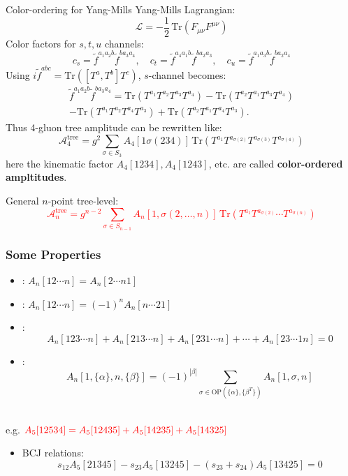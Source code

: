 \documentclass{beamer}
\begin{document}
\begin{frame}{Color-ordering for Yang-Mills}
\small
Yang-Mills Lagrangian:
\[
\mathcal{L}=-\frac12\,\mathrm{Tr}(F_{\mu\nu}F^{\mu\nu})
\]
Color factors for $s,t,u$ channels:
\[
c_s=\tilde{f}^{a_1a_2b}\tilde{f}^{ba_3a_4},\quad 
c_t=\tilde{f}^{a_4a_1b}\tilde{f}^{ba_2a_3},\quad 
c_u=\tilde{f}^{a_1a_3b}\tilde{f}^{ba_2a_4}
\]
Using $i\tilde{f}^{abc}=\mathrm{Tr}([T^a,T^b]T^c)$, $s$-channel becomes:
\begin{align*}
        \tilde{f}^{a_1a_2b}\tilde{f}^{ba_3a_4}=\mathrm{Tr}(T^{a_1}T^{a_2}T^{a_3}T^{a_4})-\mathrm{Tr}(T^{a_2}T^{a_1}T^{a_3}T^{a_4})\\
        -\mathrm{Tr}(T^{a_1}T^{a_2}T^{a_4}T^{a_3})+\mathrm{Tr}(T^{a_2}T^{a_1}T^{a_4}T^{a_3}).
    \end{align*}
Thus 4-gluon tree amplitude can be rewritten like:
\[
\mathcal{A}_4^{\text{tree}}
=g^2\!\!\sum_{\sigma\in S_3}
A_4[1\sigma(234)]\,\mathrm{Tr}(T^{a_1}T^{a_{\sigma(2)}}T^{a_{\sigma(3)}}T^{a_{\sigma(4)}})
\]
here the kinematic factor $A_4[1234],A_4[1243]$, etc. are called \textbf{color-ordered ampltitudes}.

General $n$-point tree-level:
\textcolor{red}{\[
\mathcal{A}_n^{\text{tree}}
=g^{n-2}\!\!\sum_{\sigma\in S_{n-1}}
A_n[1,\sigma(2,\dots,n)]
\,\mathrm{Tr}(T^{a_1}T^{a_{\sigma(2)}}\cdots T^{a_{\sigma(n)}})
\]}
\end{frame}


\begin{frame}
    \frametitle{Some Properties}
    \begin{itemize}
        \item {}: \quad $A_n[12\cdots n]=A_n[2\cdots n1]$
        \item {}: \quad $A_n[12\cdots n]=(-1)^nA_n[n\cdots 21]$
        \item {}: 
        $$A_n[123\cdots n]+A_n[213\cdots n]+A_n[231\cdots n]+\cdots +A_n[23\cdots 1n]=0$$
        \item {}: \quad $$A_n[1,\{\alpha\},n,\{\beta\}]=(-1)^{|\beta|}\sum_{\sigma\in\text{OP}(\{\alpha\},\{\beta^T\})}A_n[1,\sigma,n]$$\\
    \end{itemize}
    e.g. \qquad $\textcolor{red}{A_5[12534]=A_5[12435]+A_5[14235]+A_5[14325]}$
    \begin{itemize}
        \item BCJ relations: $$s_{12}A_5[21345]-s_{23}A_5[13245]-(s_{23}+s_{24})A_5[13425]=0$$
    \end{itemize}
\end{frame}
\end{document}
